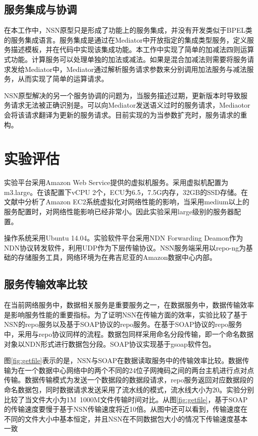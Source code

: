 \subsection{服务集成与协调}
在本工作中，NSN原型只是形成了功能上的服务集成，并没有开发类似于BPEL类的服务集成语言。服务集成是通过在Mediator中开放指定的集成类型服务，定义服务描述模板，并在代码中实现该集成功能。本工作中实现了简单的加减法四则运算式功能。计算服务可以处理单独的加法或减法。如果是混合加减法则需要将服务请求发给Mediator中，Mediator通过解析服务请求参数来分别调用加法服务与减法服务，从而实现了简单的运算请求。

NSN原型解决的另一个服务协调的问题为，当服务描述过期，更新版本时导致服务请求无法被正确识别是。可以向Mediator发送语义过时的服务请求，Mediaotor会将该请求翻译为更新的服务请求。目前实现的为当参数扩充时，服务请求的重构。

\section{实验评估}
实验平台采用Amazon Web Service提供的虚拟机服务。采用虚拟机配置为m3.large。在该配置下vCPU 2个，ECU为6.5，7.5G内存，32GB的SSD存储。在文献\cite{wang2010impact}中分析了Amazon EC2系统虚拟化对网络性能的影响，当采用medium以上的服务配置时，对网络性能影响已经非常小。因此实验采用large级别的服务器配置。

操作系统采用Ubuntu 14.04。实验软件平台采用NDN Forwarding Deamon作为NDN协议转发软件，利用UDP作为下层传输协议。NSN服务端采用以repo-ng为基础的存储服务工具，网络环境为在弗吉尼亚的Amazon数据中心内部。

\subsection{服务传输效率比较}
在当前网络服务中，数据相关服务是重要服务之一，在数据服务中，数据传输效率是影响服务性能的重要指标。为了证明NSN在传输方面的效率，实验比较了基于NSN的repo服务以及基于SOAP协议的repo服务。在基于SOAP协议的repo服务中，采用与repo协议同样的流程。数据包同样采用命名分段传输，即一个命名数据对象以NDN形式进行数据包分段。SOAP协议实现基于gsoap\cite{van2007gsoap}软件包。

图\ref{fig:getfile}表示的是，NSN与SOAP在数据读取服务中的传输效率比较。数据传输为在一个数据中心网络中的两个不同的24位子网掩码之间的两台主机进行点对点传输。数据传输模式为发送一个数据段的数据段请求，repo服务返回对应数据段的命名数据包，同时数据请求发送采用了流水线的模式，流水线大小为20。实验分别比较了当文件大小为1M~1000M文件传输时间对比。从图\ref{fig:getfile}，基于SOAP的传输速度要慢于基于NSN传输速度将近10倍。从图中还可以看到，传输速度在不同的文件大小中基本恒定，并且NSN在不同数据包大小的情况下传输速度基本一致

